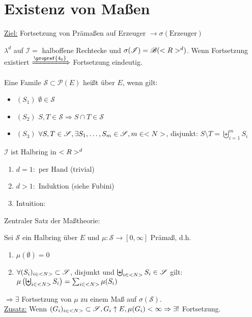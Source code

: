 \section{Existenz von Maßen}

\underline{Ziel:} Fortsetzung von Prämaßen auf Erzeuger $\rightarrow \sigma(\text{Erzeuger})$
\begin{*example}
	$\lambda^d$ auf $\mathscr{I}=$ halboffene Rechtecke und $\sigma(\mathscr{I}) = \mathscr{B}(<R>^d)$. Wenn Fortsetzung existiert $\xRightarrow{\propref{4_6}}$ Fortsetzung eindeutig. 
\end{*example}

\begin{definition}[Halbring]
	Eine Famile $\mathscr{S} \subset \mathscr{P}(E)$ heißt  über $E$, wenn gilt:
	\begin{itemize}
		\item $(S_1)$ $\emptyset \in \mathscr{S}$
		\item $(S_2)$ $S,T \in \mathscr{S} \Rightarrow S\cap T \in \mathscr{S}$
		\item $(S_3)$ $\forall S,T \in \mathscr{S}, \exists S_1,\dots,S_m \in \mathscr{S}, m \in <N>$, disjunkt: $S\setminus T = \biguplus_{i=1}^{m} S_i$
	\end{itemize}
\end{definition}

\begin{remark}
	$\mathscr{I}$ ist Halbring in $<R>^d$
	\begin{enumerate}[label=(\alph*)]
		\item $d=1:$ per Hand (trivial)
		\item $d>1:$ Induktion (siehe Fubini) %
		\item Intuition: %
	\end{enumerate}
\end{remark}

Zentraler Satz der Maßtheorie:

\begin{proposition}
	Sei $\mathscr{S}$ ein Halbring über $E$ und $\mu: \mathscr{S} \to [0,\infty]$ Prämaß, d.h.
	\begin{enumerate}[label=(\alph*)]
		\item $\mu(\emptyset) = 0$
		\item $\forall (S_i)_{i \in <N>} \subset \mathscr{S}$, disjunkt und $\biguplus_{i\in <N>} S_i \in \mathscr{S}$ gilt: $\mu\left(\biguplus_{i\in <N>} S_i\right) = \sum_{i \in <N>}\mu(S_i)$
	\end{enumerate}
	$\Rightarrow \exists$ Fortsetzung von $\mu$ zu einem Maß auf $\sigma(\mathscr{S})$.\\
	\underline{Zusatz:} Wenn $(G_i)_{i \in <N>} \subset \mathscr{S}, G_i \uparrow E, \mu(G_i) < \infty \Rightarrow \exists !$ Fortsetzung.
\end{proposition}

